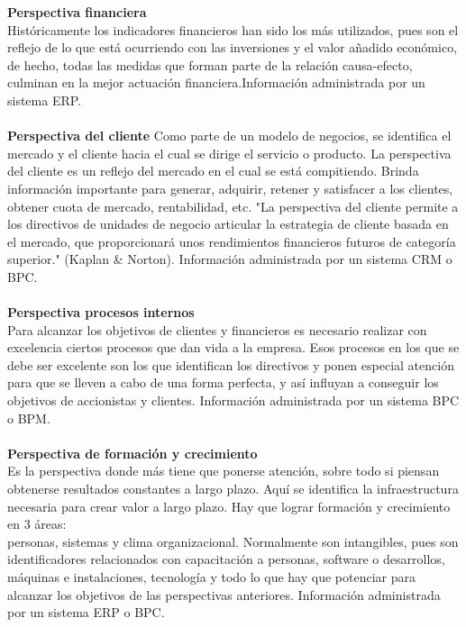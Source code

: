 {\textbf{Perspectiva financiera}\\
Históricamente los indicadores financieros han sido los más utilizados, pues son el reflejo de lo que está ocurriendo con las inversiones y el valor añadido económico, de hecho, todas las medidas que forman parte de la relación causa-efecto, culminan en la mejor actuación financiera.Información administrada por un sistema ERP.\\\\
\textbf{Perspectiva del cliente}
Como parte de un modelo de negocios, se identifica el mercado y el cliente hacia el cual se dirige el servicio o producto. La perspectiva del cliente es un reflejo del mercado en el cual se está compitiendo. Brinda información importante para generar, adquirir, retener y satisfacer a los clientes, obtener cuota de mercado, rentabilidad, etc. "La perspectiva del cliente permite a los directivos de unidades de negocio articular la estrategia de cliente basada en el mercado, que proporcionará unos rendimientos financieros futuros de categoría superior." (Kaplan & Norton).
Información administrada por un sistema CRM o BPC.\\\\
\textbf{Perspectiva procesos internos}\\
Para alcanzar los objetivos de clientes y financieros es necesario realizar con excelencia ciertos procesos que dan vida a la empresa. Esos procesos en los que se debe ser excelente son los que identifican los directivos y ponen especial atención para que se lleven a cabo de una forma perfecta, y así influyan a conseguir los objetivos de accionistas y clientes.
Información administrada por un sistema BPC o BPM.\\\\
\textbf{Perspectiva de formación y crecimiento}\\
Es la perspectiva donde más tiene que ponerse atención, sobre todo si piensan obtenerse resultados constantes a largo plazo. Aquí se identifica la infraestructura necesaria para crear valor a largo plazo. Hay que lograr formación y crecimiento en 3 áreas:\\ personas, sistemas y clima organizacional. Normalmente son intangibles, pues son identificadores relacionados con capacitación a personas, software o desarrollos, máquinas e instalaciones, tecnología y todo lo que hay que potenciar para alcanzar los objetivos de las perspectivas anteriores.
Información administrada por un sistema ERP o BPC.}

